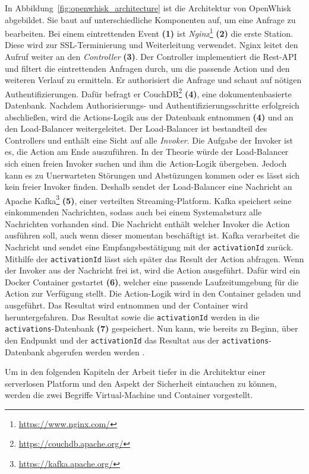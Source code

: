 In Abbildung~\ref{fig:openwhisk_architecture} ist die Architektur von
OpenWhisk abgebildet. Sie baut auf unterschiedliche Komponenten auf,
um eine Anfrage zu bearbeiten. Bei einem eintrettenden Event \textbf{(1)}
ist \emph{Nginx}\footnote{\url{https://www.nginx.com/}} \textbf{(2)} die erste
Station. Diese wird zur SSL-Terminierung und Weiterleitung verwendet.
Nginx leitet den Aufruf weiter an den \emph{Controller} \textbf{(3)}.
Der Controller implementiert die Rest-API und filtert die
eintrettenden Anfragen durch, um die passende Action und
den weiteren Verlauf zu ermitteln.
Er authorisiert die Anfrage und schaut auf nötigen Authentifizierungen.
Dafür befragt er CouchDB\footnote{\url{https://couchdb.apache.org/}}
\textbf{(4)},
eine dokumentenbasierte Datenbank. Nachdem Authorisierungs-
und Authentifizierungsschritte erfolgreich abschließen,
wird die Actions-Logik aus der Datenbank entnommen \textbf{(4)} und an den
Load-Balancer weitergeleitet. Der Load-Balancer ist bestandteil
des Controllers und enthält eine Sicht auf alle \emph{Invoker}.
Die Aufgabe der Invoker ist es, die Action am Ende auszuführen.
In der Theorie würde der Load-Balancer sich einen freien Invoker suchen
und ihm die Action-Logik übergeben. Jedoch kann es zu Unerwarteten
Störungen und Abstüzungen kommen oder es lässt sich kein freier
Invoker finden. Deshalb sendet der Load-Balancer eine Nachricht an
Apache Kafka\footnote{\url{https://kafka.apache.org/}} \textbf{(5)},
einer verteilten Streaming-Platform. Kafka speichert seine
einkommenden Nachrichten, sodass auch bei einem Systemabsturz alle
Nachrichten vorhanden sind. Die Nachricht enthält welcher
Invoker die Action ausführen soll, auch wenn dieser momentan
beschäftigt ist. Kafka verarbeitet die Nachricht und sendet eine
Empfangsbestätigung mit der \texttt{activationId} zurück. Mithilfe
der \texttt{activationId} lässt sich später das Result der Action
abfragen. Wenn der Invoker aus der Nachricht frei ist, wird die
Action ausgeführt. Dafür wird ein Docker Container gestartet \textbf{(6)},
welcher eine passende Laufzeitumgebung für die Action zur Verfügung
stellt. Die Action-Logik wird in den Container geladen und ausgeführt.
Das Resultat wird entnommen und der Container wird heruntergefahren.
Das Resultat sowie die \texttt{activationId} werden in die
\texttt{activations}-Datenbank \textbf{(7)} gespeichert. Nun kann, wie bereits zu Beginn,
über den Endpunkt und der \texttt{activationId} das Resultat aus
der \texttt{activations}-Datenbank abgerufen werden werden
\cite{OpenWhiskGithub}.

Um in den folgenden Kapiteln der Arbeit tiefer in die Architektur einer
serverlosen Platform und den Aspekt der Sicherheit eintauchen zu können,
werden die zwei Begriffe Virtual-Machine und Container vorgestellt.

